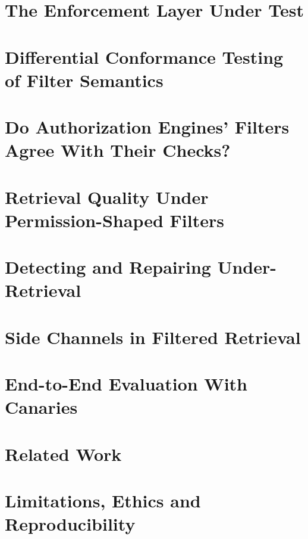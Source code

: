 \documentclass[11pt]{article}
\begin{document}
\section{The Enforcement Layer Under Test}\label{sec:system}


\section{Differential Conformance Testing of Filter Semantics}\label{sec:conformance}


\section{Do Authorization Engines' Filters Agree With Their Checks?}\label{sec:engines}


\section{Retrieval Quality Under Permission-Shaped Filters}\label{sec:quality}


\section{Detecting and Repairing Under-Retrieval}\label{sec:repair}


\section{Side Channels in Filtered Retrieval}\label{sec:side}


\section{End-to-End Evaluation With Canaries}\label{sec:e2e}


\section{Related Work}\label{sec:related}


\section{Limitations, Ethics and Reproducibility}\label{sec:limits}

\end{document}
